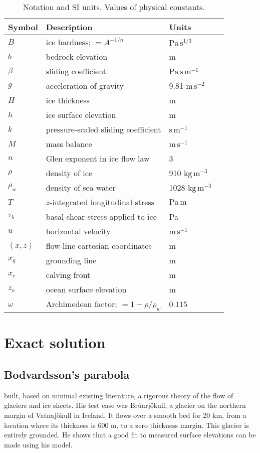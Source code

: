 \documentclass[review,letterpaper]{igs}
\begin{document}
\begin{table}
\caption{Notation and SI units.  Values of physical constants.}\label{tab:notation}

\medskip
\begin{tabular}{llll}
Symbol & Description & Units \\ \hline
$B$ & ice hardness; $=A^{-1/n}$ & $\text{Pa}\,\text{s}^{1/3}$  \\
$b$ & bedrock elevation & m \\
$\beta$ & sliding coefficient & $\text{Pa}\,\text{s}\,\text{m}^{-1}$ \\
$g$ & acceleration of gravity  & 9.81 $\text{m}\,\text{s}^{-2}$\\
$H$ & ice thickness & m \\
$h$ & ice surface elevation & m \\
$k$ & pressure-scaled sliding coefficient  & $\text{s}\,\text{m}^{-1}$ \\
$M$ & mass balance & $\text{m}\,\text{s}^{-1}$ \\
$n$ & Glen exponent in ice flow law & 3 \\
$\rho$ & density of ice & 910 $\text{kg}\,\text{m}^{-3}$ \\
$\rho_w$ & density of sea water & 1028 $\text{kg}\,\text{m}^{-3}$ \\
$T$ & $z$-integrated longitudinal stress & $\text{Pa}\,\text{m}$ \\
$\tau_{b}$ & basal shear stress applied to ice & Pa \\
$u$ & horizontal velocity & $\text{m}\,\text{s}^{-1}$ \\
$(x,z)$ & flow-line cartesian coordinates & m  \\
$x_g$ & grounding line & m  \\
$x_c$ & calving front & m  \\
$z_o$ & ocean surface elevation & m \\
$\omega$ & Archimedean factor; $=1 - \rho/\rho_w$ & $0.115$
\end{tabular}
\end{table}


\section{Exact solution}

\subsection*{Bodvardsson's parabola}  \cite{Bodvardsson} built, based on minimal existing literature, a rigorous theory of the flow of glaciers and ice sheets.  His test case was Br\'uarj\"okull, a glacier on the northern margin of Vatnaj\"okull in Iceland.  It flows over a smooth bed for 20 km, from a location where its thickness is 600 m, to a zero thickness margin.  This glacier is entirely grounded.  He shows that a good fit to measured surface elevations can be made using his model.
\end{document}

